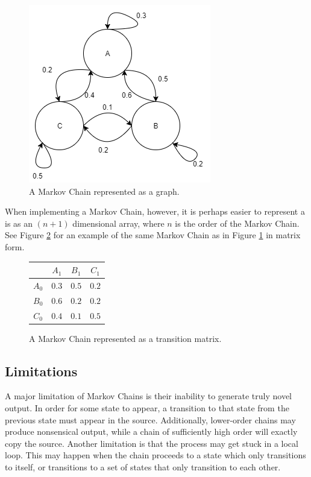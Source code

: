 \begin{figure}[h]
	\centering
	\includegraphics[]{figures/markovGraph.png} %
	\caption{A Markov Chain represented as a graph.}
	\label{fig:markovGraph}
\end{figure}

When implementing a Markov Chain, however, it is perhaps easier to represent a is as an $(n + 1)$ dimensional array, where $n$ is the order of the Markov Chain.
See Figure \ref{fig:markovMatrix} for an example of the same Markov Chain as in Figure \ref{fig:markovGraph} in matrix form.

\begin{figure}[h]
	\centering
	\begin{tabular}{c | c c c}
		& $A_{1}$ & $B_{1}$ & $C_{1}$\\
		\hline
		$A_{0}$ & $0.3$ & $0.5$ & $0.2$\\
		$B_{0}$ & $0.6$ & $0.2$ & $0.2$\\
		$C_{0}$ & $0.4$ & $0.1$ & $0.5$
	\end{tabular}
	\caption{A Markov Chain represented as a transition matrix.}
	\label{fig:markovMatrix}
\end{figure}

\subsection{Limitations} \label{bg:markov:limitations}

A major limitation of Markov Chains is their inability to generate truly novel output.
In order for some state to appear, a transition to that state from the previous state must appear in the source.
Additionally, lower-order chains may produce nonsensical output, while a chain of sufficiently high order will exactly copy the source.
Another limitation is that the process may get stuck in a local loop.
This may happen when the chain proceeds to a state which only transitions to itself, or transitions to a set of states that only transition to each other.
